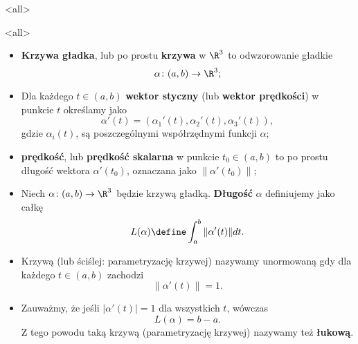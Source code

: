 \mode*
\mode<all>{}

\begin{frame}[<+->]
\begin{center}
\begin{tikzpicture}[y=0.80pt, x=0.8pt,scale=0.7,yscale=-1, inner sep=0pt, 
outer sep=0pt]

\end{tikzpicture}
\end{center}
\end{frame}
\mode<all>{}
\begin{frame}[<+->]
\begin{definicja}
\begin{itemize}
\item\textbf{Krzywa gładka}, lub po prostu \textbf{krzywa} w $\R^3$ to 
odwzorowanie gładkie \[\alpha\colon (a,b)\to \R^3;\]
\item Dla każdego $t\in (a,b)$ \textbf{wektor styczny} (lub \textbf{wektor 
prędkości}) w punkcie $t$ określamy jako 
\[\alpha'(t)=(\alpha_1'(t),\alpha_2'(t),\alpha_3'(t)),\]
gdzie $\alpha_i(t)$, są poszczególnymi współrzędnymi funkcji $\alpha$;
\item \textbf{prędkość}, lub \textbf{prędkość skalarna} w punkcie $t_0\in (a,b)$
to po prostu długość wektora $\alpha'(t_0)$, oznaczana jako $\|\alpha'(t_0)\|$;
\end{itemize}
\end{definicja}
\end{frame}
\begin{frame}[<+->]

\begin{definicja}
\begin{itemize}
\item Niech $\alpha\colon (a,b)\to \R^3$ będzie krzywą gładką. \textbf{Długość} 
$\alpha$ definiujemy jako całkę
\[L(\alpha)\define\int_a^b\|\alpha'(t)\|dt.\]
\item Krzywą (lub ściślej: parametryzację krzywej) nazywamy unormowaną gdy dla 
każdego $t\in (a,b)$ zachodzi \[\|\alpha'(t)\|=1.\]
\item Zauważmy, że jeśli $|\alpha'(t)|=1$ dla wszystkich $t$, w\'owczas 
\[L(\alpha)=b-a.\]Z tego powodu taką krzywą (parametryzację krzywej) nazywamy 
też \textbf{łukową}.
\end{itemize}

\end{definicja}
\end{frame}
